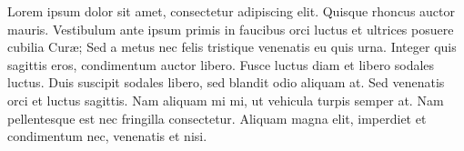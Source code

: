 Lorem ipsum dolor sit amet, consectetur adipiscing elit. Quisque rhoncus auctor mauris. Vestibulum ante ipsum primis in faucibus orci luctus et ultrices posuere cubilia Cur\ae{}; Sed a metus nec felis tristique venenatis eu quis urna. Integer quis sagittis eros, condimentum auctor libero. Fusce luctus diam et libero sodales luctus. Duis suscipit sodales libero, sed blandit odio aliquam at. Sed venenatis orci et luctus sagittis. Nam aliquam mi mi, ut vehicula turpis semper at. Nam pellentesque est nec fringilla consectetur. Aliquam magna elit, imperdiet et condimentum nec, venenatis et nisi. 
